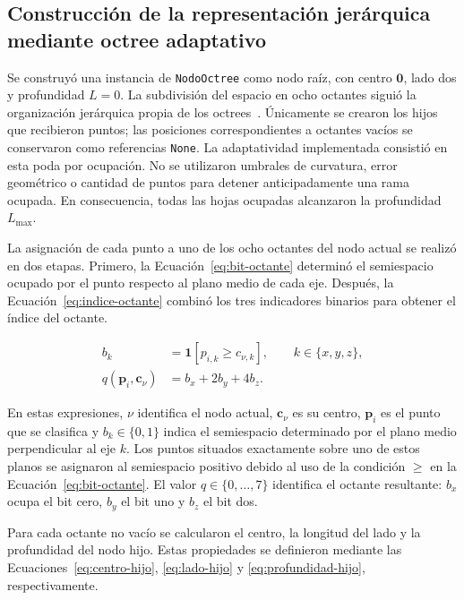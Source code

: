\subsection{Construcción de la representación jerárquica mediante octree adaptativo}
\label{subsec:octree-adaptativo}

Se construyó una instancia de \texttt{NodoOctree} como nodo raíz, con centro $\mathbf{0}$, lado dos y profundidad $L=0$. La subdivisión del espacio en ocho octantes siguió la organización jerárquica propia de los octrees~\parencite{samet}. Únicamente se crearon los hijos que recibieron puntos; las posiciones correspondientes a octantes vacíos se conservaron como referencias \texttt{None}. La adaptatividad implementada consistió en esta poda por ocupación. No se utilizaron umbrales de curvatura, error geométrico o cantidad de puntos para detener anticipadamente una rama ocupada. En consecuencia, todas las hojas ocupadas alcanzaron la profundidad $L_{\max}$.

La asignación de cada punto a uno de los ocho octantes del nodo actual se realizó en dos etapas. Primero, la Ecuación~\eqref{eq:bit-octante} determinó el semiespacio ocupado por el punto respecto al plano medio de cada eje. Después, la Ecuación~\eqref{eq:indice-octante} combinó los tres indicadores binarios para obtener el índice del octante.

\begin{subequations}\label{eq:octante}
\begin{align}
b_k
&=
\mathbf 1
\left[
p_{i,k}\geq c_{\nu,k}
\right],
\qquad
k\in\{x,y,z\},
\label{eq:bit-octante}\\
q(\mathbf p_i,\mathbf c_\nu)
&=
b_x+2b_y+4b_z.
\label{eq:indice-octante}
\end{align}
\end{subequations}

En estas expresiones, $\nu$ identifica el nodo actual, $\mathbf c_\nu$ es su centro, $\mathbf p_i$ es el punto que se clasifica y $b_k\in\{0,1\}$ indica el semiespacio determinado por el plano medio perpendicular al eje $k$. Los puntos situados exactamente sobre uno de estos planos se asignaron al semiespacio positivo debido al uso de la condición $\geq$ en la Ecuación~\eqref{eq:bit-octante}. El valor $q\in\{0,\ldots,7\}$ identifica el octante resultante: $b_x$ ocupa el bit cero, $b_y$ el bit uno y $b_z$ el bit dos.

Para cada octante no vacío se calcularon el centro, la longitud del
lado y la profundidad del nodo hijo. Estas propiedades se definieron
mediante las Ecuaciones~\eqref{eq:centro-hijo},
\eqref{eq:lado-hijo} y \eqref{eq:profundidad-hijo},
respectivamente.

